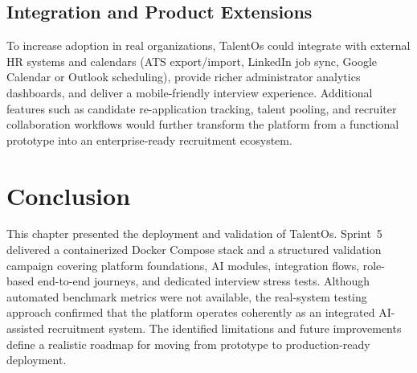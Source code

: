 \subsection{Integration and Product Extensions}

To increase adoption in real organizations, TalentOs could integrate with external HR systems and calendars (ATS export/import, LinkedIn job sync, Google Calendar or Outlook scheduling), provide richer administrator analytics dashboards, and deliver a mobile-friendly interview experience. Additional features such as candidate re-application tracking, talent pooling, and recruiter collaboration workflows would further transform the platform from a functional prototype into an enterprise-ready recruitment ecosystem.

\section*{Conclusion}
This chapter presented the deployment and validation of TalentOs. Sprint~5 delivered a containerized Docker Compose stack and a structured validation campaign covering platform foundations, AI modules, integration flows, role-based end-to-end journeys, and dedicated interview stress tests. Although automated benchmark metrics were not available, the real-system testing approach confirmed that the platform operates coherently as an integrated AI-assisted recruitment system. The identified limitations and future improvements define a realistic roadmap for moving from prototype to production-ready deployment.

